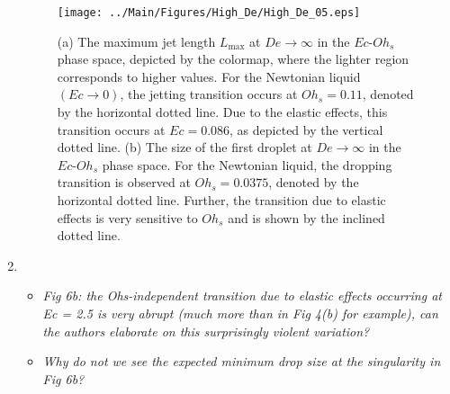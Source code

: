 \documentclass[]{article}
\newcommand{\vsy}[1]{\todo[color=orange, bordercolor=none, textcolor=white]{Vatsal}\textcolor{orange}{#1}}
\newcommand{\bb}{\color{black} \normalfont}
\newcommand{\vs}{\color{orange} \normalfont}
\begin{document}
\begin{enumerate}
    \begin{figure}
    	\texttt{[image: ../Main/Figures/High\_De/High\_De\_05.eps]}
    	\caption{(a) The maximum jet length $L_{\text{max}}$ at $De \to \infty$ in the $Ec$-$Oh_s$ phase space, depicted by the colormap, where the lighter region corresponds to higher values. For the Newtonian liquid $\left(Ec \to 0\right)$, the jetting transition occurs at $Oh_s = 0.11$, denoted by the horizontal dotted line. Due to the elastic effects, this transition occurs at $Ec = 0.086$, as depicted by the vertical dotted line. (b) The size of the first droplet at $De \to \infty$ in the $Ec$-$Oh_s$ phase space. For the Newtonian liquid, the dropping transition is observed at $Oh_s = 0.0375$, denoted by the horizontal dotted line. Further, the transition due to elastic effects is very sensitive to $Oh_s$ and is shown by the inclined dotted line.}
    	\label{highDe}
    \end{figure}

	\item
	\begin{itemize}
		\item \textit{Fig 6b: the Ohs-independent transition due to elastic effects occurring at Ec = 2.5 is very abrupt (much more than in Fig 4(b) for example), can the authors elaborate on this surprisingly violent variation?}


		\item \textit{Why do not we see the expected minimum drop size at the singularity in Fig 6b?}


\end{itemize}
\end{enumerate}
\end{document}
